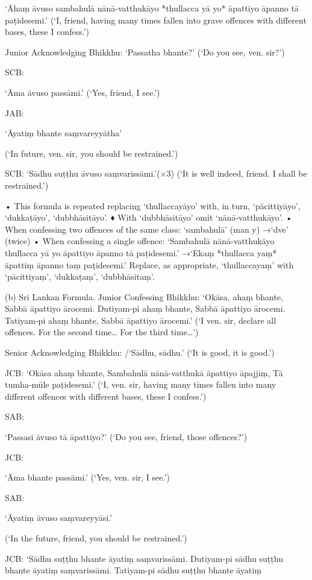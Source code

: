 ‘Āhaṃ āvuso sambahulā nānā-vatthukāyo
*thullacca yā yo* āpattiyo āpanno tā paṭidesemi.’
(‘I, friend, having many times fallen into grave
offences with different bases, these I confess.’)

Junior Acknowledging Bhikkhu:
‘Passatha bhante?’
(‘Do you see, ven. sir?’)

SCB:

‘Āma āvuso passāmi.’
(‘Yes, friend, I see.’)

JAB:

‘Āyatiṃ bhante saṃvareyyātha’

(‘In future, ven. sir, you should be restrained.’)

SCB: ‘Sādhu suṭṭhu āvuso saṃvarissāmi.’(×3)
(‘It is well indeed, friend. I shall be restrained.’)

• This formula is repeated replacing
‘thullaccayāyo’ with, in turn, ‘pācittiyāyo’,
‘dukkaṭāyo’, ‘dubbhāsitāyo’.
♦ With ‘dubbhāsitāyo’ omit ‘nānā-vatthukāyo’.
• When confessing two offences of the same class:
‘sambahulā’ (man y) →‘dve’ (twice)
• When confessing a single offence:
‘Sambahulā nānā-vatthukāyo thullacca yā yo
āpattiyo āpanno tā paṭidesemi.’
→‘Ekaṃ *thullacca yaṃ* āpattiṃ āpanno taṃ
paṭidesemi.’
Replace, as appropriate, ‘thullaccayaṃ’ with
‘pācittiyaṃ’, ‘dukkaṭaṃ’, ‘dubbhāsitaṃ’.

(b) Sri Lankan Formula.
Junior Confessing Bhikkhu:
‘Okāsa, ahaṃ bhante,
Sabbā āpattiyo ārocemi.
Dutiyam-pi ahaṃ bhante,
Sabbā āpattiyo ārocemi.
Tatiyam-pi ahaṃ bhante,
Sabbā āpattiyo ārocemi.’
(‘I ven. sir, declare all offences. For the second
time… For the third time…’)

Senior Acknowledging Bhikkhu:
/‘Sādhu, sādhu.’
(‘It is good, it is good.’)

JCB:
‘Okāsa ahaṃ bhante,
Sambahulā nānā-vatthukā āpattiyo āpajjiṃ,
Tā tumha-mūle paṭidesemi.’
(‘I, ven. sir, having many times fallen into many
different offences with different bases, these I confess.’)

SAB:

‘Passasi āvuso tā āpattiyo?’
(‘Do you see, friend, those offences?’)

JCB:

‘Āma bhante passāmi.’
(‘Yes, ven. sir, I see.’)

SAB:

‘Āyatiṃ āvuso saṃvareyyāsi.’

(‘In the future, friend, you should be restrained.’)

JCB: ‘Sādhu suṭṭhu bhante āyatiṃ saṃvarissāmi.
Dutiyam-pi sādhu suṭṭhu bhante āyatiṃ
saṃvarissāmi.
Tatiyam-pi sādhu suṭṭhu bhante āyatiṃ

